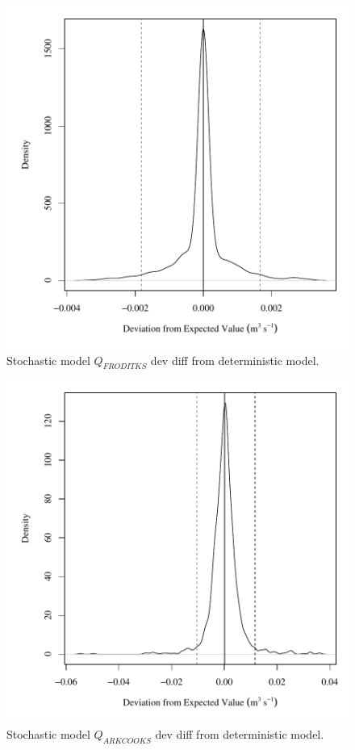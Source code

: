 \begin{center}
\begin{figure}[htbp]
	\includegraphics[width=6in]{"Figures/Results_DSR/V dev diff qFRO"}
	\caption{Stochastic model $Q_{FRODITKS}$ dev diff from deterministic model.}
\end{figure}
\end{center}
\newpage

\begin{center}
\begin{figure}[htbp]
	\includegraphics[width=6in]{"Figures/Results_DSR/V dev diff qout"}
	\caption{Stochastic model $Q_{ARKCOOKS}$ dev diff from deterministic model.}
\end{figure}
\end{center}
\newpage

